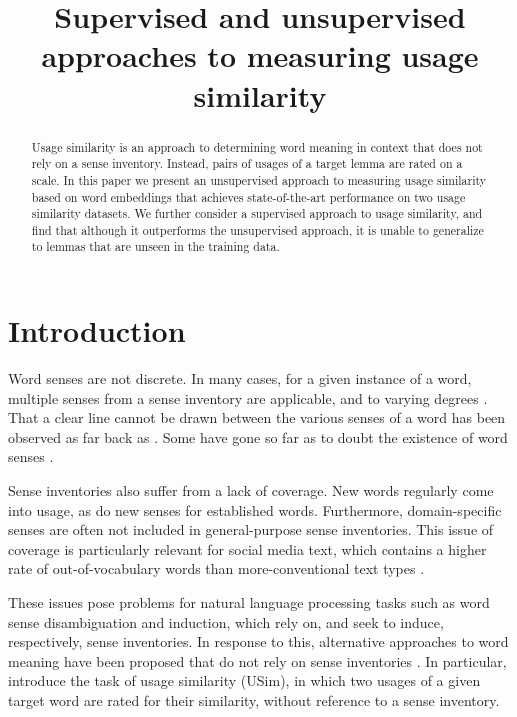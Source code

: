 \documentclass[11pt]{article}
\title{Supervised and unsupervised approaches to measuring usage similarity}
\author{}
\date{}
\begin{document}
\maketitle

\begin{abstract}

Usage similarity is an approach to determining word meaning in context
that does not rely on a sense inventory. Instead, pairs of usages of a
target lemma are rated on a scale. In this paper we present an
unsupervised approach to measuring usage similarity based on word
embeddings that achieves state-of-the-art performance on two usage
similarity datasets. We further consider a supervised approach to
usage similarity, and find that although it outperforms the
unsupervised approach, it is unable to generalize to lemmas that are
unseen in the training data.
\end{abstract}

\section{Introduction}

Word senses are not discrete. In many cases, for a given instance of a
word, multiple senses from a sense inventory are applicable, and to
varying degrees \citep{Erk2009b}. That a clear line cannot be drawn
between the various senses of a word has been observed as far back as
\cite{Johnson1755}. Some have gone so far as to doubt the existence of
word senses \citep{Kilgarriff1997}.


Sense inventories also suffer from a lack of coverage. New words
regularly come into usage, as do new senses for established
words. Furthermore, domain-specific senses are often not included in
general-purpose sense inventories.
This issue of coverage is particularly relevant for social media text,
which contains a higher rate of out-of-vocabulary words than
more-conventional text types \citep{Baldwin+:2013}.

These issues pose problems for natural language processing tasks such
as word sense disambiguation and induction, which rely on, and seek to
induce, respectively, sense inventories. In response to this,
alternative approaches to word meaning have been proposed that do not
rely on sense inventories \citep{Erk2009b}. In particular,
\citeauthor{Erk2009b} introduce the task of usage similarity (USim),
in which two usages of a given target word are rated for their
similarity, without reference to a sense inventory.
\end{document}

